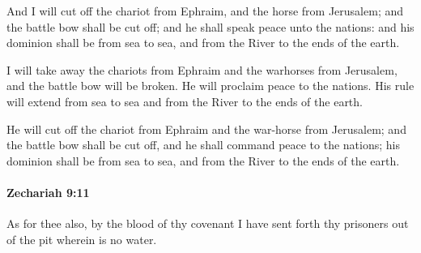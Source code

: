 			\begin{versebox}
					\item[BHS] 
					\item[LXX] 
					\item[ASV] And I will cut off the chariot from Ephraim, and the horse from Jerusalem; and the battle bow shall be cut off; and he shall speak peace unto the nations: and his dominion shall be from sea to sea, and from the River to the ends of the earth.
					\item[NIV] I will take away the chariots from Ephraim and the warhorses from Jerusalem, and the battle bow will be broken. He will proclaim peace to the nations. His rule will extend from sea to sea and from the River to the ends of the earth.
					\item[NRSV] He will cut off the chariot from Ephraim and the war-horse from Jerusalem; and the battle bow shall be cut off, and he shall command peace to the nations; his dominion shall be from sea to sea, and from the River to the ends of the earth.
			\end{versebox}

		\paragraph{Zechariah 9:11} %
			\label{ZECHARIAH-9-11}

			As for thee also, by the blood of thy covenant I have sent forth thy prisoners out of the pit wherein is no water.


